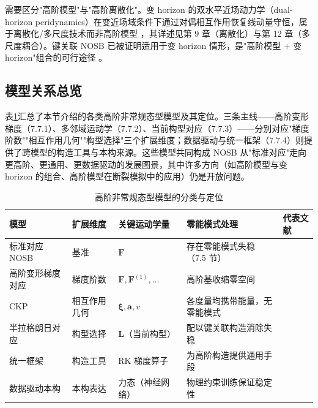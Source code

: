 \begin{remark}
  需要区分"高阶模型"与"高阶离散化"。变 horizon 的双水平近场动力学（dual-horizon peridynamics）在变近场域条件下通过对偶相互作用恢复线动量守恒，属于离散化/多尺度技术而非高阶模型 \cite{Ren2017dualhorizon}，其详述见第 9 章（离散化）与第 12 章（多尺度耦合）。键关联 NOSB 已被证明适用于变 horizon 情形，是"高阶模型 + 变 horizon"组合的可行途径 \cite{GuZhangMadenciXia2019}。
\end{remark}

\subsection{模型关系总览}\label{sec:higher-order-overview}

表\ref{tab:higher-order-models}汇总了本节介绍的各类高阶非常规态型模型及其定位。三条主线——高阶变形梯度（7.7.1）、多邻域运动学（7.7.2）、当前构型对应（7.7.3）——分别对应"梯度阶数""相互作用几何""构型选择"三个扩展维度；数据驱动与统一框架（7.7.4）则提供了跨模型的构造工具与本构来源。这些模型共同构成 NOSB 从"标准对应"走向更高阶、更通用、更数据驱动的发展图景，其中许多方向（如高阶模型与变 horizon 的组合、高阶模型在断裂模拟中的应用）仍是开放问题。

\begin{table}[htbp]
  \centering
  \small
  \caption{高阶非常规态型模型的分类与定位}
  \label{tab:higher-order-models}
  \begin{tabular}{@{}>{\raggedright\arraybackslash}p{}>{\raggedright\arraybackslash}p{}>{\raggedright\arraybackslash}p{}>{\raggedright\arraybackslash}p{}>{\raggedright\arraybackslash}p{}@{}}
    \toprule
    模型 & 扩展维度 & 关键运动学量 & 零能模式处理 & 代表文献 \\
    \midrule
    标准对应 NOSB & 基准 & $\mathbf{F}$ & 存在零能模式失稳（7.5 节） & \cite{Silling2007} \\
    高阶变形梯度对应 & 梯度阶数 & $\mathbf{F},\mathbf{F}^{(1)},\ldots$ & 高阶基收缩零空间 & \cite{ChenChan2020,GuZhangMadenciXia2019} \\
    CKP & 相互作用几何 & $\boldsymbol{\xi},\mathbf{a},v$ & 各度量均携带能量，无零能模式 & \cite{Javili2019} \\
    半拉格朗日对应 & 构型选择 & $\mathbf{L}$（当前构型） & 配以键关联构造消除失稳 & \cite{BehzadinasabFoster2020} \\
    统一框架 & 构造工具 & RK 梯度算子 & 为高阶构造提供通用手段 & \cite{Bessa2014} \\
    数据驱动本构 & 本构表达 & 力态（神经网络） & 物理约束训练保证稳定性 & \cite{Xu2021} \\
    \bottomrule
  \end{tabular}
\end{table}

